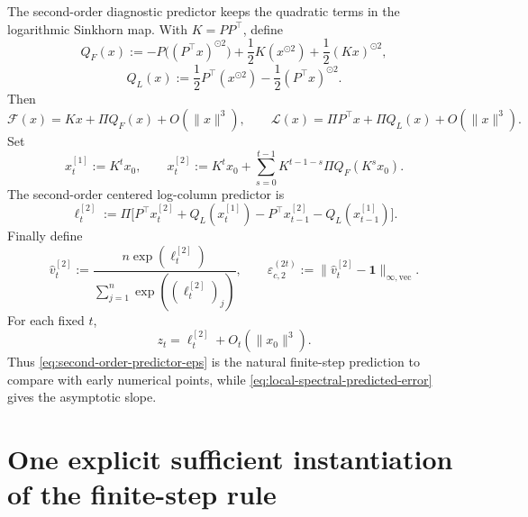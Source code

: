 \documentclass[11pt]{article}
\numberwithin{equation}{section}
\theoremstyle{plain}
\theoremstyle{definition}
\theoremstyle{remark}
\newcommand{\ones}{\mathbf{1}}
\begin{document}
The second-order diagnostic predictor keeps the quadratic terms in the
logarithmic Sinkhorn map.  With \(K=PP^\top\), define
\begin{equation}\label{eq:QF-QL}
        Q_F(x)
        :=
        -P\big((P^\top x)^{\odot2}\big)
        +\frac12 K(x^{\odot2})
        +\frac12 (Kx)^{\odot2},
\end{equation}
\begin{equation}\label{eq:QL}
        Q_L(x)
        :=
        \frac12 P^\top(x^{\odot2})
        -\frac12 (P^\top x)^{\odot2}.
\end{equation}
Then
\begin{equation}\label{eq:F-L-second-expansion}
        \mathcal F(x)=Kx+\Pi Q_F(x)+O(\|x\|^3),
        \qquad
        \mathcal L(x)=\Pi P^\top x+\Pi Q_L(x)+O(\|x\|^3).
\end{equation}
Set
\begin{equation}\label{eq:second-order-x}
        x_t^{[1]}:=K^t x_0,
        \qquad
        x_t^{[2]}
        :=
        K^t x_0+
        \sum_{s=0}^{t-1}K^{t-1-s}\Pi Q_F(K^s x_0).
\end{equation}
The second-order centered log-column predictor is
\begin{equation}\label{eq:second-order-predictor-log}
        \ell_t^{[2]}
        :=
        \Pi\Big[
        P^\top x_t^{[2]}+Q_L(x_t^{[1]})
        -P^\top x_{t-1}^{[2]}-Q_L(x_{t-1}^{[1]})
        \Big].
\end{equation}
Finally define
\begin{equation}\label{eq:second-order-predictor-eps}
        \widehat v_t^{[2]}
        :=
        \frac{n\exp(\ell_t^{[2]})}{\sum_{j=1}^n\exp((\ell_t^{[2]})_j)},
        \qquad
        \widehat\varepsilon_{c,2}^{(2t)}
        :=
        \|\widehat v_t^{[2]}-\ones\|_{\infty,\mathrm{vec}}.
\end{equation}
For each fixed \(t\),
\begin{equation}\label{eq:second-order-accuracy}
        z_t=\ell_t^{[2]}+O_t(\|x_0\|^3).
\end{equation}
Thus \eqref{eq:second-order-predictor-eps} is the natural finite-step prediction
to compare with early numerical points, while
\eqref{eq:local-spectral-predicted-error} gives the asymptotic slope.


\section{One explicit sufficient instantiation of the finite-step rule}\label{app:constants}
\end{document}

